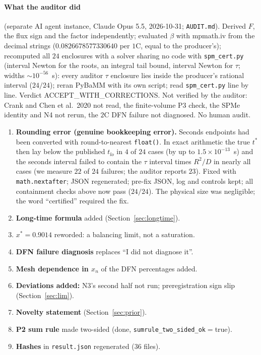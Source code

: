 \documentclass[10pt]{article}
\begin{document}
\paragraph{What the auditor did} (separate AI agent instance, Claude Opus 5.5, 2026-10-31; \texttt{AUDIT.md}). Derived $F$, the flux sign and the factor independently; evaluated $\beta$ with mpmath.iv from the decimal strings ($0.0826678577330640$ per $1$C, equal to the producer's); recomputed all $24$ enclosures with a solver sharing no code with \texttt{spm\_cert.py} (interval Newton for the roots, an integral tail bound, interval Newton for $\tau$; widths $\sim10^{-56}$~s): every auditor $\tau$ enclosure lies inside the producer's rational interval ($24/24$); reran PyBaMM with its own script; read \texttt{spm\_cert.py} line by line. Verdict ACCEPT\_WITH\_CORRECTIONS. Not verified by the auditor: Crank and Chen et al.\ 2020 not read, the finite-volume P3 check, the SPMe identity and N4 not rerun, the $2$C DFN failure not diagnosed. No human audit.
\begin{enumerate}\itemsep=1pt
\item \textbf{Rounding error (genuine bookkeeping error).} Seconds endpoints had been converted with round-to-nearest \texttt{float()}. In exact arithmetic the true $t^*$ then lay below the published $t_{lo}$ in $4$ of $24$ cases (by up to $1.5\times10^{-13}$~s) and the seconds interval failed to contain the $\tau$ interval times $R^2/D$ in nearly all cases (we measure $22$ of $24$ failures; the auditor reports $23$). Fixed with \texttt{math.nextafter}; JSON regenerated; pre-fix JSON, log and controls kept; all containment checks above now pass ($24/24$). The physical size was negligible; the word ``certified'' required the fix.
\item \textbf{Long-time formula} added (Section~\ref{sec:longtime}).
\item \textbf{$x^*=0.9014$} reworded: a balancing limit, not a saturation.
\item \textbf{DFN failure diagnosis} replaces ``I did not diagnose it''.
\item \textbf{Mesh dependence in $x_n$} of the DFN percentages added.
\item \textbf{Deviations added:} N3's second half not run; preregistration sign slip (Section~\ref{sec:lim}).
\item \textbf{Novelty statement} (Section~\ref{sec:prior}).
\item \textbf{P2 sum rule} made two-sided (done, \texttt{sumrule\_two\_sided\_ok}$=$true).
\item \textbf{Hashes} in \texttt{result.json} regenerated ($36$ files).
\end{enumerate}
\end{document}
